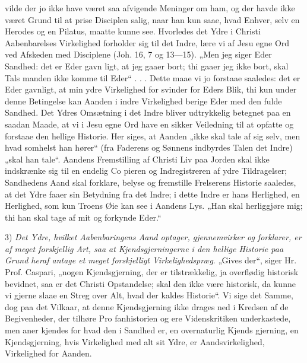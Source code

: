 \documentclass[12pt]{book}
\newcommand{\opage}[1]{\marginnote{\footnotesize\textit{[#1]}}}
\begin{document}
vilde der jo ikke have været saa afvigende Meninger om
ham, og der havde ikke været Grund til at prise Disciplen
salig, naar han kun saae, hvad Enhver, selv en Herodes og
en Pilatus, maatte kunne see. Hvorledes det Ydre i Christi
Aabenbarelses Virkelighed forholder sig til det Indre, lære vi
af Jesu egne Ord ved Afskeden med Disciplene (Joh. 16, 7 og
13---15). „Men jeg siger Eder Sandhed: det er Eder gavn\-%
ligt, at jeg gaaer bort; thi gaaer jeg ikke bort, skal Tals\-%
manden ikke komme til Eder“ . . . Dette maae vi jo forstaae
saaledes: det er Eder gavnligt, at min ydre Virkelighed for\-%
\opage{306}\setcounter{footnote}{0}%
svinder for Eders Blik, thi kun under denne Betingelse kan
Aanden i indre Virkelighed berige Eder med den fulde Sandhed.
Det Ydres Omsætning i det Indre bliver udtrykkelig betegnet
paa en saadan Maade, at vi i Jesu egne Ord have en sikker
Veiledning til at opfatte og forstaae den hellige Historie.
Her siges, at Aanden „ikke skal tale af sig selv, men hvad\-%
somhelst han hører“ (fra Faderens og Sønnens indbyrdes Talen
det Indre) „skal han tale“. Aandens Fremstilling af Christi
Liv paa Jorden skal ikke indskrænke sig til en endelig Co\-%
pieren og Indregistreren af ydre Tildragelser; Sandhedens
Aand skal forklare, belyse og fremstille Frelserens Historie
saaledes, at det Ydre faaer sin Betydning fra det Indre; i dette
Indre er hans Herlighed, en Herlighed, som kun Troens Øie
kan see i Aandens Lys. „Han skal herliggjøre mig; thi han
skal tage af mit og forkynde Eder.“

3) \emph{Det Ydre, hvilket Aabenbaringens Aand
optager, gjennemvirker og forklarer, er af meget
forskjellig Art, saa at Kjendsgjerningerne i den
hellige Historie paa Grund heraf antage et meget
forskjelligt Virkelighedspræg}. „Gives der“, siger Hr.
Prof. Caspari, „nogen Kjendsgjerning, der er tilstrækkelig, ja
overflødig historisk bevidnet, saa er det Christi Opstandelse;
skal den ikke være historisk, da kunne vi gjerne slaae en
Streg over Alt, hvad der kaldes Historie“. Vi sige det
Samme, dog paa det Vilkaar, at denne Kjendsgjerning ikke
drages ned i Kredsen af de Begivenheder, der tilhøre Pro\-%
fanhistorien og ere Videnskritiken underkastede, men aner\-%
kjendes for hvad den i Sandhed er, en overnaturlig Kjends\-%
gjerning, en Kjendsgjerning, hvis Virkelighed med alt sit Ydre,
er Aandsvirkelighed, Virkelighed for Aanden.
\end{document}
